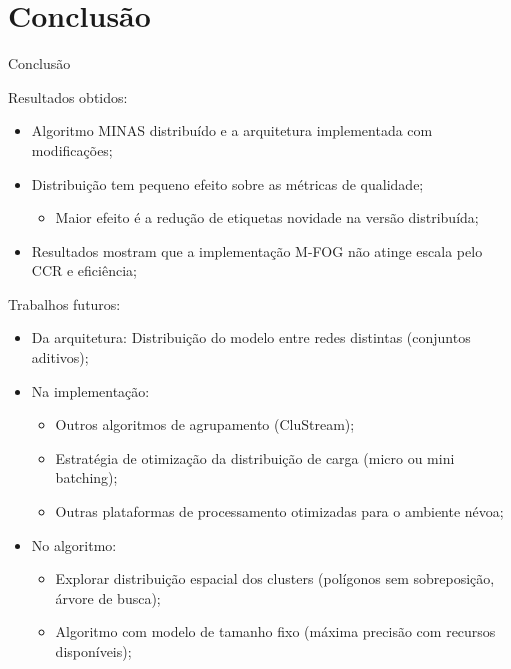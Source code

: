 \documentclass[aspectratio=1610,10pt]{beamer}
\newcommand{\mfog}{M-FOG\xspace}
\newcommand{\minas}{MINAS\xspace}
\begin{document}
\section{Conclusão}
\begin{frame}{Conclusão}
  
  \begin{alertblock}{Resultados obtidos:}
  \begin{itemize}%
    \item Algoritmo \minas distribuído e a arquitetura \arch
    implementada com modificações;
    \item Distribuição tem pequeno efeito sobre as métricas de qualidade;
    \begin{itemize}
      \item Maior efeito é a redução de etiquetas novidade na versão distribuída;
    \end{itemize}
    \item Resultados mostram que a implementação \mfog não atinge escala pelo CCR e eficiência;
  \end{itemize}
  \end{alertblock}
  
  \pause\vspace{.5em}
  \begin{alertblock}{Trabalhos futuros:}
  \begin{itemize}%
    \item Da arquitetura: Distribuição do modelo entre redes distintas (conjuntos aditivos);
    \item Na implementação:
    \begin{itemize}
    \item Outros algoritmos de agrupamento (CluStream);
    \item Estratégia de otimização da distribuição de carga (micro ou mini batching);
    \item Outras plataformas de processamento otimizadas para o ambiente névoa;
    \end{itemize}
    \item No algoritmo:
    \begin{itemize}
    \item Explorar distribuição espacial dos clusters (polígonos sem
    sobreposição, árvore de busca);
    \item Algoritmo com modelo de tamanho fixo (máxima precisão com recursos disponíveis);
    \end{itemize}
  \end{itemize}
  \end{alertblock}
\end{frame}
\end{document}
